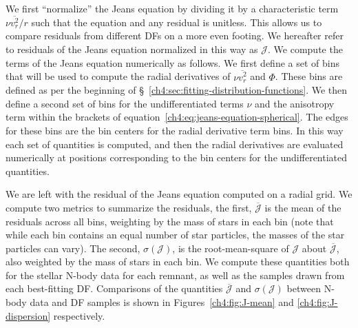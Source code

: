 We first ``normalize'' the Jeans equation by dividing it by a characteristic term $\nu\overline{v^{2}_{r}}/r$ such that the equation and any residual is unitless. This allows us to compare residuals from different DFs on a more even footing. We hereafter refer to residuals of the Jeans equation normalized in this way as $\mathcal{J}$. We compute the terms of the Jeans equation numerically as follows. We first define a set of bins that will be used to compute the radial derivatives of $\nu \overline{v^{2}_{r}}$ and $\Phi$. These bins are defined as per the beginning of \S~\ref{ch4:sec:fitting-distribution-functions}. We then define a second set of bins for the undifferentiated terms $\nu$ and the anisotropy term within the brackets of equation~\eqref{ch4:eq:jeans-equation-spherical}. The edges for these bins are the bin centers for the radial derivative term bins. In this way each set of quantities is computed, and then the radial derivatives are evaluated numerically at positions corresponding to the bin centers for the undifferentiated quantities.

We are left with the residual of the Jeans equation computed on a radial grid. We compute two metrics to summarize the residuals, the first, $\overline{\mathcal{J}}$ is the mean of the residuals across all bins, weighting by the mass of stars in each bin (note that while each bin contains an equal number of star particles, the masses of the star particles can vary). The second, $\sigma(\mathcal{J})$, is the root-mean-square of $\mathcal{J}$ about $\overline{\mathcal{J}}$, also weighted by the mass of stars in each bin. We compute these quantities both for the stellar N-body data for each remnant, as well as the samples drawn from each best-fitting DF. Comparisons of the quantities $\overline{\mathcal{J}}$ and $\sigma(\mathcal{J})$ between N-body data and DF samples is shown in Figures~\ref{ch4:fig:J-mean} and \ref{ch4:fig:J-dispersion} respectively.

